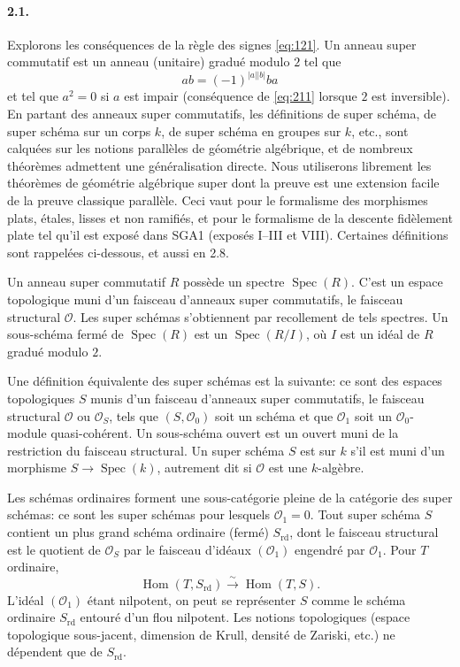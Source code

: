 \documentclass[11pt]{article}
\newcommand{\Spec}{\operatorname{Spec}}
\newcommand{\Hom}{\operatorname{Hom}}
\newcommand{\rd}{\mathrm{rd}}
\newcommand{\calO}{\mathcal O}
\begin{document}
\paragraph{2.1.}
Explorons les conséquences de la règle des signes \eqref{eq:121}. Un anneau super commutatif est un anneau (unitaire) gradué modulo $2$ tel que
\begin{equation}
\label{eq:211}
ab=(-1)^{|a||b|}ba
\end{equation}
et tel que $a^2=0$ si $a$ est impair (conséquence de \eqref{eq:211} lorsque $2$ est inversible). En partant des anneaux super commutatifs, les définitions de super schéma, de super schéma sur un corps $k$, de super schéma en groupes sur $k$, etc., sont calquées sur les notions parallèles de géométrie algébrique, et de nombreux théorèmes admettent une généralisation directe. Nous utiliserons librement les théorèmes de géométrie algébrique super dont la preuve est une extension facile de la preuve classique parallèle. Ceci vaut pour le formalisme des morphismes plats, étales, lisses et non ramifiés, et pour le formalisme de la descente fidèlement plate tel qu'il est exposé dans SGA1 (exposés I--III et VIII). Certaines définitions sont rappelées ci-dessous, et aussi en 2.8.

Un anneau super commutatif $R$ possède un spectre $\Spec(R)$. C'est un espace topologique muni d'un faisceau d'anneaux super commutatifs, le faisceau structural $\calO$. Les super schémas s'obtiennent par recollement de tels spectres. Un sous-schéma fermé de $\Spec(R)$ est un $\Spec(R/I)$, où $I$ est un idéal de $R$ gradué modulo $2$.

Une définition équivalente des super schémas est la suivante: ce sont des espaces topologiques $S$ munis d'un faisceau d'anneaux super commutatifs, le faisceau structural $\calO$ ou $\calO_S$, tels que $(S,\calO_0)$ soit un schéma et que $\calO_1$ soit un $\calO_0$-module quasi-cohérent. Un sous-schéma ouvert est un ouvert muni de la restriction du faisceau structural. Un super schéma $S$ est sur $k$ s'il est muni d'un morphisme $S\to\Spec(k)$, autrement dit si $\calO$ est une $k$-algèbre.

Les schémas ordinaires forment une sous-catégorie pleine de la catégorie des super schémas: ce sont les super schémas pour lesquels $\calO_1=0$. Tout super schéma $S$ contient un plus grand schéma ordinaire (fermé) $S_{\rd}$, dont le faisceau structural est le quotient de $\calO_S$ par le faisceau d'idéaux $(\calO_1)$ engendré par $\calO_1$. Pour $T$ ordinaire,
\[
\Hom(T,S_{\rd})\xrightarrow{\sim}\Hom(T,S).
\]
L'idéal $(\calO_1)$ étant nilpotent, on peut se représenter $S$ comme le schéma ordinaire $S_{\rd}$ entouré d'un flou nilpotent. Les notions topologiques (espace topologique sous-jacent, dimension de Krull, densité de Zariski, etc.) ne dépendent que de $S_{\rd}$.
\end{document}
